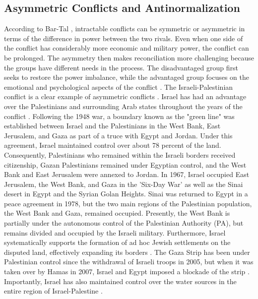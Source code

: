 \documentclass[dissertation,math,vertlayout,pdfa,colorlinks]{aaltoseries}
\begin{document}
\subsection{Asymmetric Conflicts and Antinormalization}
According to Bar-Tal \cite{bar-talIntractableConflictsSociopsychological2013}, intractable conflicts can be symmetric or asymmetric in terms of the difference in power between the two rivals. Even when one side of the conflict has considerably more economic and military power, the conflict can be prolonged. The asymmetry then makes reconciliation more challenging because the groups have different needs in the process. The disadvantaged group first seeks to restore the power imbalance, while the advantaged group focuses on the emotional and psychological aspects of the conflict \cite[p. 384]{bar-talIntractableConflictsSociopsychological2013}. The Israeli-Palestinian conflict is a clear example of asymmetric conflicts \cite{ramsbothamRadicalAsymmetryConflict2022}. Israel has had an advantage over the Palestinians and surrounding Arab states throughout the years of the conflict \cite{westfallIsraeliPalestinianConflictChronology2023}. Following the 1948 war, a boundary known as the "green line" was established between Israel and the Palestinians in the West Bank, East Jerusalem, and Gaza as part of a truce with Egypt and Jordan. Under this agreement, Israel maintained control over about 78 percent of the land. Consequently, Palestinians who remained within the Israeli borders received citizenship, Gazan Palestinians remained under Egyptian control, and the West Bank and East Jerusalem were annexed to Jordan. In 1967, Israel occupied East Jerusalem, the West Bank, and Gaza in the 'Six-Day War' as well as the Sinai desert in Egypt and the Syrian Golan Heights. Sinai was returned to Egypt in a peace agreement in 1978, but the two main regions of the Palestinian population, the West Bank and Gaza, remained occupied. Presently, the West Bank is partially under the autonomous control of the Palestinian Authority (PA), but remains divided and occupied by the Israeli military. Furthermore, Israel systematically supports the formation of ad hoc Jewish settlements on the disputed land, effectively expanding its borders \cite{handelGatedGatingCommunity2014}. The Gaza Strip has been under Palestinian control since the withdrawal of Israeli troops in 2005, but when it was taken over by Hamas in 2007, Israel and Egypt imposed a blockade of the strip \cite{adnanEconomicIntegrationElimination2022}. Importantly, Israel has also maintained control over the water sources in the entire region of Israel-Palestine \cite{frohlichSecurityDiscourseIsraeli2012}.
\end{document}
